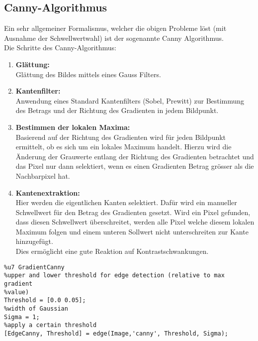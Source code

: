 \subsection{Canny-Algorithmus}
Ein sehr allgemeiner Formalismus, welcher die obigen Probleme löst (mit Ausnahme der Schwellwertwahl) ist der sogenannte Canny Algorithmus.\\
Die Schritte des Canny-Algorithmus:
\begin{enumerate}
    \item \textbf{Glättung:}\\
    Glättung des Bildes mittels eines Gauss Filters.
    \item \textbf{Kantenfilter:}\\
    Anwendung eines Standard Kantenfilters (Sobel, Prewitt) zur Bestimmung des Betrags und der Richtung des Gradienten in jedem Bildpunkt.
    \item \textbf{Bestimmen der lokalen Maxima:}\\
    Basierend auf der Richtung des Gradienten wird für jeden Bildpunkt ermittelt, ob es sich um ein lokales Maximum handelt. Hierzu wird die Änderung der Grauwerte entlang der Richtung des Gradienten betrachtet und das Pixel nur dann selektiert, wenn es einen Gradienten Betrag grösser als die Nachbarpixel hat.
    \item \textbf{Kantenextraktion:}\\
    Hier werden die eigentlichen Kanten selektiert. Dafür wird ein manueller Schwellwert für den Betrag des Gradienten gesetzt. Wird ein Pixel gefunden, dass diesen Schwellwert überschreitet, werden alle Pixel welche diesem lokalen Maximum folgen und einem unteren Sollwert nicht unterschreiten zur Kante hinzugefügt.\\
    Dies ermöglicht eine gute Reaktion auf Kontrastschwankungen.
\end{enumerate}
\begin{lstlisting}
%u7 GradientCanny
%upper and lower threshold for edge detection (relative to max gradient
%value)
Threshold = [0.0 0.05];
%width of Gaussian
Sigma = 1;
%apply a certain threshold
[EdgeCanny, Threshold] = edge(Image,'canny', Threshold, Sigma);
\end{lstlisting}

